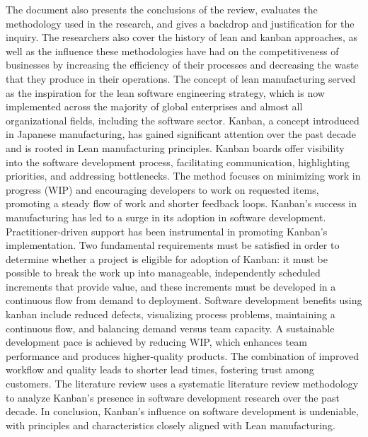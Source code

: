 \documentclass[conference]{IEEEtran}
\begin{document}
The document also presents the conclusions of the review, evaluates the methodology used in the research, and gives a backdrop and justification for the inquiry. The researchers also cover the history of lean and kanban approaches, as well as the influence these methodologies have had on the competitiveness of businesses by increasing the efficiency of their processes and decreasing the waste that they produce in their operations. The concept of lean manufacturing served as the inspiration for the lean software engineering strategy, which is now implemented across the majority of global enterprises and almost all organizational fields, including the software sector.
\newline
Kanban, a concept introduced in Japanese manufacturing, has gained significant attention  over the past decade and is rooted in Lean manufacturing principles. Kanban boards offer visibility into the software development process, facilitating communication, highlighting priorities, and addressing bottlenecks. The method focuses on minimizing work in progress (WIP) and encouraging developers to work on requested items, promoting a steady flow of work and shorter feedback loops.
Kanban's success in manufacturing has led to a surge in its adoption in software development. Practitioner-driven support has been instrumental in promoting Kanban's implementation. Two fundamental requirements must be satisfied in order to determine whether a project is eligible for adoption of Kanban: it must be possible to break the work up into manageable, independently scheduled increments that provide value, and these increments must be developed in a continuous flow from demand to deployment.
Software development benefits using kanban include reduced defects, visualizing process problems, maintaining a continuous flow, and balancing demand versus team capacity. A sustainable development pace is achieved by reducing WIP, which enhances team performance and produces higher-quality products.
 The combination of improved workflow and quality leads to shorter lead times, fostering trust among customers. The literature review uses a systematic literature review methodology to analyze Kanban's presence in software development research over the past decade. In conclusion, Kanban's influence on software development is undeniable, with principles and characteristics closely aligned with Lean manufacturing.
\newline
\newline
\end{document}
